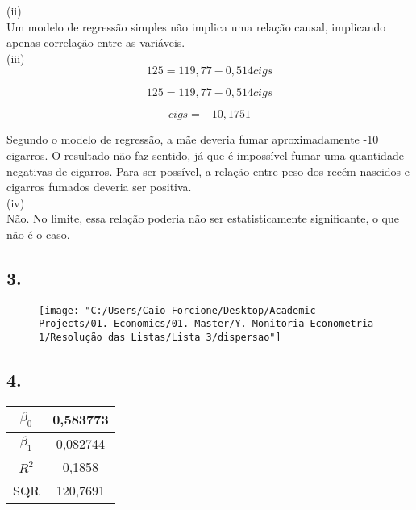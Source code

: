 \documentclass[hidelinks,11pt]{book}
\theoremstyle{definition}
\begin{document}
(ii)\\

Um modelo de regressão simples não implica uma relação causal, implicando apenas correlação entre as variáveis.\\

(iii)\\

\begin{displaymath}
	125 = 119,77 - 0,514 cigs
\end{displaymath}


\begin{displaymath}
	125 = 119,77 - 0,514 cigs
\end{displaymath}

\begin{displaymath}
	cigs = -10,1751
\end{displaymath}

Segundo o modelo de regressão, a mãe deveria fumar aproximadamente -10 cigarros. O resultado não faz sentido, já que é impossível fumar uma quantidade negativas de cigarros. Para ser possível, a relação entre peso dos recém-nascidos e cigarros fumados deveria ser positiva.\\

(iv)\\

Não. No limite, essa relação poderia não ser estatisticamente significante, o que não é o caso.

	\subsection*{3.}
	


\begin{figure}[H]
	\centering
	\texttt{[image: "C:/Users/Caio Forcione/Desktop/Academic Projects/01. Economics/01. Master/Y. Monitoria Econometria 1/Resolução das Listas/Lista 3/dispersao"]}
	\caption*{}
\end{figure}

	\subsection*{4.}
	
		\begin{center}
		\begin{tabular}{|c|c|}\hline
		$\beta_0$ & 0,583773\\\hline
		$\beta_1$ & 0,082744\\\hline
		$R^2$ & 0,1858\\\hline
		SQR & 120,7691\\\hline
		\end{tabular}
	\end{center}
\end{document}
